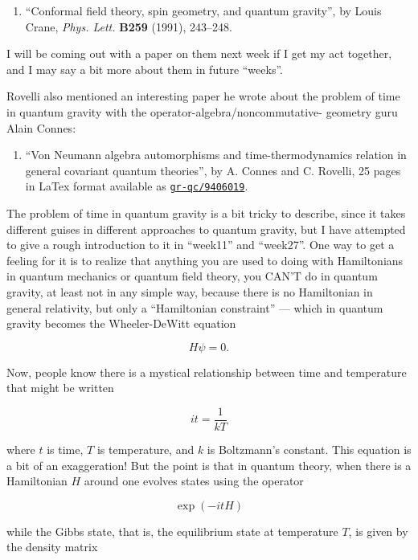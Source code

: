 \documentclass{article}
\def\tightlist{}
\begin{document}
\begin{enumerate}
\def\labelenumi{\arabic{enumi})}
\setcounter{enumi}{2}
\tightlist
\item
  ``Conformal field theory, spin geometry, and quantum gravity'', by
  Louis Crane, \emph{Phys. Lett.} \textbf{B259} (1991), 243--248.
\end{enumerate}

I will be coming out with a paper on them next week if I get my act
together, and I may say a bit more about them in future ``weeks''.

Rovelli also mentioned an interesting paper he wrote about the problem
of time in quantum gravity with the operator-algebra/noncommutative-
geometry guru Alain Connes:

\begin{enumerate}
\def\labelenumi{\arabic{enumi})}
\setcounter{enumi}{3}
\tightlist
\item
  ``Von Neumann algebra automorphisms and time-thermodynamics relation
  in general covariant quantum theories'', by A. Connes and C. Rovelli,
  25 pages in LaTex format available as
  \href{http://xxx.lanl.gov/abs/gr-qc/9406019}{\texttt{gr-qc/9406019}}.
\end{enumerate}

The problem of time in quantum gravity is a bit tricky to describe,
since it takes different guises in different approaches to quantum
gravity, but I have attempted to give a rough introduction to it in
``week11'' and ``week27''. One way to get a feeling for it is to realize
that anything you are used to doing with Hamiltonians in quantum
mechanics or quantum field theory, you CAN'T do in quantum gravity, at
least not in any simple way, because there is no Hamiltonian in general
relativity, but only a ``Hamiltonian constraint'' --- which in quantum
gravity becomes the Wheeler-DeWitt equation

\[H \psi = 0.\]

Now, people know there is a mystical relationship between time and
temperature that might be written

\[it = \frac{1}{kT}\]

where \(t\) is time, \(T\) is temperature, and \(k\) is Boltzmann's
constant. This equation is a bit of an exaggeration! But the point is
that in quantum theory, when there is a Hamiltonian \(H\) around one
evolves states using the operator

\[\exp(-itH)\]

while the Gibbs state, that is, the equilibrium state at temperature
\(T\), is given by the density matrix
\end{document}
